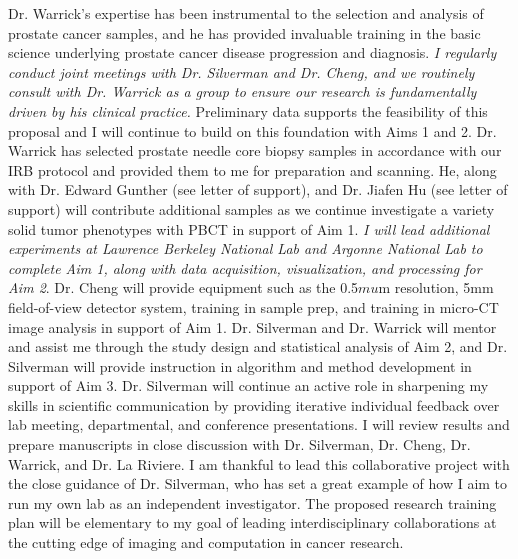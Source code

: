 \documentclass{NIHGrant}
\begin{document}
Dr. Warrick's expertise has been instrumental to the selection and analysis of prostate cancer samples, and he has provided invaluable training in the basic science underlying prostate cancer disease progression and diagnosis. \emph{I regularly conduct joint meetings with Dr. Silverman and Dr. Cheng, and we routinely consult with Dr. Warrick as a group to ensure our research is fundamentally driven by his clinical practice.} Preliminary data supports the feasibility of this proposal and I will continue to build on this foundation with Aims 1 and 2.  Dr. Warrick has selected prostate needle core biopsy samples in accordance with our IRB protocol and provided them to me for preparation and scanning. He, along with Dr. Edward Gunther (see letter of support), and Dr. Jiafen Hu (see letter of support) will contribute additional samples as we continue investigate a variety solid tumor phenotypes with PBCT in support of Aim 1. \emph{I will lead additional experiments at Lawrence Berkeley National Lab and Argonne National Lab to complete Aim 1, along with data acquisition, visualization, and processing for Aim 2}. Dr. Cheng will provide equipment such as the 0.5$mu$m resolution, 5mm field-of-view detector system, training in sample prep, and training in micro-CT image analysis in support of Aim 1. Dr. Silverman and Dr. Warrick will mentor and assist me through the study design and statistical analysis of Aim 2, and Dr. Silverman will provide instruction in algorithm and method development in support of Aim 3. Dr. Silverman will continue an active role in sharpening my skills in scientific communication by providing iterative individual feedback over lab meeting, departmental, and conference presentations. I will review results and prepare manuscripts in close discussion with Dr. Silverman, Dr. Cheng, Dr. Warrick, and Dr. La Riviere. I am thankful to lead this collaborative project with the close guidance of Dr. Silverman, who has set a great example of how I aim to run my own lab as an independent investigator. The proposed research training plan will be elementary to my goal of leading interdisciplinary collaborations at the cutting edge of imaging and computation in cancer research.


\end{document}

